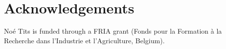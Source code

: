 \documentclass[11pt,a4paper]{article}
\begin{document}
\section{Acknowledgements}

No\'e Tits  is funded through a FRIA grant (Fonds pour la Formation \`a la Recherche dans l'Industrie et l'Agriculture, Belgium). 



\end{document}
